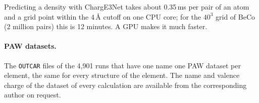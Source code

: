 \documentclass[journal=jctcce,manuscript=suppinfo,email=true]{achemso}
\newcommand{\rev}[1]{{\color{blue}#1}}
\begin{document}
Predicting a density with ChargE3Net takes about 0.35\,ms per pair of an atom
and a grid point within the 4\,\AA{} cutoff on one CPU core; for the $40^3$ grid
of BeCo (2 million pairs) this is 12 minutes. A GPU makes it much faster.

\paragraph{PAW datasets.} The \texttt{OUTCAR} files of the 4,901 runs
that have one name one PAW dataset per element, the same for every structure of
the element. \rev{The name and valence charge of the dataset of every
calculation are available from the corresponding author on request.}
\end{document}
